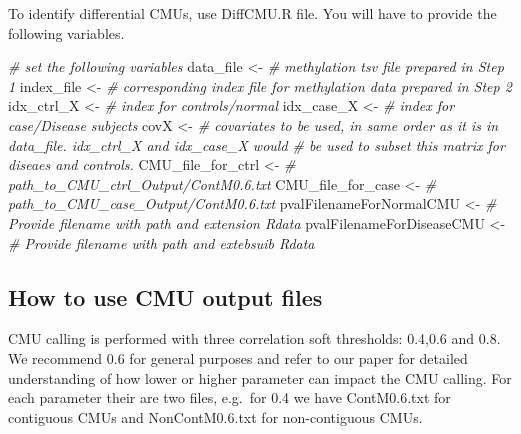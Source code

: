 \documentclass[
]{article}
\newenvironment{Shaded}{\begin{snugshade}}{\end{snugshade}}
\newcommand{\CommentTok}[1]{\textcolor[rgb]{0.56,0.35,0.01}{\textit{#1}}}
\newcommand{\NormalTok}[1]{#1}
\newcommand{\OtherTok}[1]{\textcolor[rgb]{0.56,0.35,0.01}{#1}}
\begin{document}
To identify differential CMUs, use DiffCMU.R file. You will have to
provide the following variables.

\begin{Shaded}
\begin{Highlighting}[]
\CommentTok{\# set the following variables }
\NormalTok{data\_file }\OtherTok{\textless{}{-}} \CommentTok{\# methylation tsv file prepared  in Step 1 }
\NormalTok{index\_file }\OtherTok{\textless{}{-}} \CommentTok{\# corresponding index file for  methylation data prepared in Step 2}
\NormalTok{idx\_ctrl\_X  }\OtherTok{\textless{}{-}} \CommentTok{\# index for controls/normal }
\NormalTok{idx\_case\_X  }\OtherTok{\textless{}{-}} \CommentTok{\# index for case/Disease subjects  }
\NormalTok{covX }\OtherTok{\textless{}{-}} \CommentTok{\# covariates to be used, in same order as it is in data\_file. idx\_ctrl\_X and idx\_case\_X would  \# be used to subset this matrix for diseaes and controls. }
\NormalTok{CMU\_file\_for\_ctrl }\OtherTok{\textless{}{-}} \CommentTok{\# path\_to\_CMU\_ctrl\_Output/ContM0.6.txt}
\NormalTok{CMU\_file\_for\_case }\OtherTok{\textless{}{-}} \CommentTok{\# path\_to\_CMU\_case\_Output/ContM0.6.txt}
\NormalTok{pvalFilenameForNormalCMU }\OtherTok{\textless{}{-}} \CommentTok{\# Provide filename with path and extension Rdata}
\NormalTok{pvalFilenameForDiseaseCMU }\OtherTok{\textless{}{-}} \CommentTok{\# Provide filename with path and extebsuib Rdata}
\end{Highlighting}
\end{Shaded}

\subsection{How to use CMU output files}\label{cmuOutput}

CMU calling is performed with three correlation soft thresholds: 0.4,0.6
and 0.8. We recommend 0.6 for general purposes and refer to our paper
for detailed understanding of how lower or higher parameter can impact
the CMU calling. For each parameter their are two files, e.g.~for 0.4 we
have ContM0.6.txt for contiguous CMUs and NonContM0.6.txt for
non-contiguous CMUs.
\end{document}

